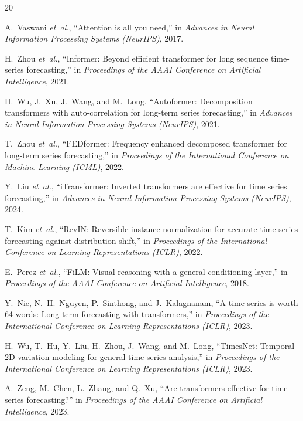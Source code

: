 \documentclass[journal]{IEEEtran}
\begin{document}
\begin{thebibliography}{20}

A.~Vaswani \emph{et~al.}, ``Attention is all you need,'' in \emph{Advances in Neural Information Processing Systems (NeurIPS)}, 2017.

H.~Zhou \emph{et~al.}, ``Informer: Beyond efficient transformer for long sequence time-series forecasting,'' in \emph{Proceedings of the AAAI Conference on Artificial Intelligence}, 2021.

H.~Wu, J.~Xu, J.~Wang, and M.~Long, ``Autoformer: Decomposition transformers with auto-correlation for long-term series forecasting,'' in \emph{Advances in Neural Information Processing Systems (NeurIPS)}, 2021.

T.~Zhou \emph{et~al.}, ``FEDformer: Frequency enhanced decomposed transformer for long-term series forecasting,'' in \emph{Proceedings of the International Conference on Machine Learning (ICML)}, 2022.

Y.~Liu \emph{et~al.}, ``iTransformer: Inverted transformers are effective for time series forecasting,'' in \emph{Advances in Neural Information Processing Systems (NeurIPS)}, 2024.

T.~Kim \emph{et~al.}, ``RevIN: Reversible instance normalization for accurate time-series forecasting against distribution shift,'' in \emph{Proceedings of the International Conference on Learning Representations (ICLR)}, 2022.

E.~Perez \emph{et~al.}, ``FiLM: Visual reasoning with a general conditioning layer,'' in \emph{Proceedings of the AAAI Conference on Artificial Intelligence}, 2018.

Y.~Nie, N.~H.~Nguyen, P.~Sinthong, and J.~Kalagnanam, ``A time series is worth 64 words: Long-term forecasting with transformers,'' in \emph{Proceedings of the International Conference on Learning Representations (ICLR)}, 2023.

H.~Wu, T.~Hu, Y.~Liu, H.~Zhou, J.~Wang, and M.~Long, ``TimesNet: Temporal 2D-variation modeling for general time series analysis,'' in \emph{Proceedings of the International Conference on Learning Representations (ICLR)}, 2023.

A.~Zeng, M.~Chen, L.~Zhang, and Q.~Xu, ``Are transformers effective for time series forecasting?'' in \emph{Proceedings of the AAAI Conference on Artificial Intelligence}, 2023.


\end{thebibliography}
\end{document}
